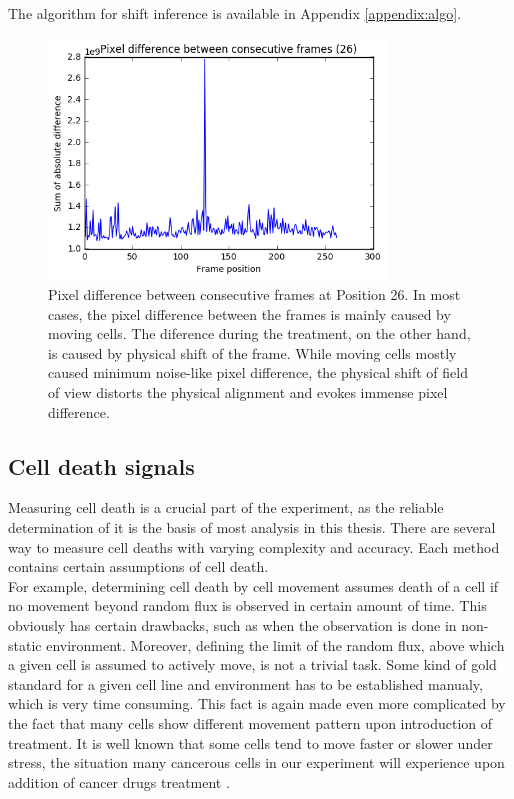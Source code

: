 \documentclass[pdftex,12pt,a4paper]{report}
\begin{document}
The algorithm for shift inference is available in Appendix \ref{appendix:algo}.

\begin{figure}[h]
\centering
\includegraphics[width=0.8\textwidth]{images/pixdiff}
\caption{Pixel difference between consecutive frames at Position 26. In most cases, the pixel difference between the frames is mainly caused by moving cells. The diference during the treatment, on the other hand, is caused by physical shift of the frame. While moving cells mostly caused minimum noise-like pixel difference, the physical shift of field of view distorts the physical alignment and evokes immense pixel difference.}
\label{fig:pixdiff}
\end{figure}

\subsection{Cell death signals}

Measuring cell death is a crucial part of the experiment, as the reliable determination of it is the basis of most analysis in this thesis. There are several way to measure cell deaths with varying complexity and accuracy. Each method contains certain assumptions of cell death.\\

For example, determining cell death by cell movement assumes death of a cell if no movement beyond random flux is observed in certain amount of time. This obviously has certain drawbacks, such as when the observation is done in non-static environment. Moreover, defining the limit of the random flux, above which a given cell is assumed to actively move, is not a trivial task. Some kind of gold standard for a given cell line and environment has to be established manualy, which is very time consuming. This fact is again made even more complicated by the fact that many cells show different movement pattern upon introduction of treatment. It is well known that some cells tend to move faster or slower under stress, the situation many cancerous cells in our experiment will experience upon addition of cancer drugs treatment \cite{pienta1991effects, fenteany2003small, ruocco2012suppressing}.\\
\end{document}
